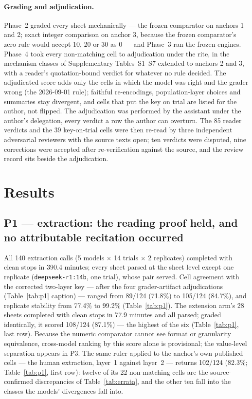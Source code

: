 \documentclass[11pt]{article}
\begin{document}
\paragraph{Grading and adjudication.} Phase~2 graded every sheet mechanically --- the frozen comparator on anchors 1 and 2; exact integer comparison on anchor 3, because the frozen comparator's zero rule would accept 10, 20 or 30 as 0 --- and Phase~3 ran the frozen engines. Phase~4 took every non-matching cell to adjudication under the rite, in the mechanism classes of Supplementary Tables~S1--S7 extended to anchors 2 and 3, with a reader's quotation-bound verdict for whatever no rule decided. The adjudicated score adds only the cells in which the model was right and the grader wrong (the 2026-09-01 rule); faithful re-encodings, population-layer choices and summaries stay divergent, and cells that put the key on trial are listed for the author, not flipped. The adjudication was performed by the assistant under the author's delegation, every verdict a row the author can overturn. The 85 reader verdicts and the 39 key-on-trial cells were then re-read by three independent adversarial reviewers with the source texts open; ten verdicts were disputed, nine corrections were accepted after re-verification against the source, and the review record sits beside the adjudication.

\section{Results}

\subsection{P1 --- extraction: the reading proof held, and no attributable recitation occurred}
All 140 extraction calls (5 models $\times$ 14 trials $\times$ 2 replicates) completed with clean stops in 390.4 minutes; every sheet parsed at the sheet level except one replicate (\texttt{deepseek-r1:14b}, one trial), whose pair served. Cell agreement with the corrected two-layer key --- after the four grader-artifact adjudications (Table~\ref{tab:p1} caption) --- ranged from 89/124 (71.8\%) to 105/124 (84.7\%), and replicate stability from 77.4\% to 99.2\% (Table~\ref{tab:p1}). The extension arm's 28 sheets completed with clean stops in 77.9 minutes and all parsed; graded identically, it scored 108/124 (87.1\%) --- the highest of the six (Table~\ref{tab:p1}, last row). Because the numeric comparator cannot see format or granularity equivalence, cross-model ranking by this score alone is provisional; the value-level separation appears in P3. The same ruler applied to the anchor's own published cells --- the human extraction, layer~1 against layer~2 --- returns 102/124 (82.3\%; Table~\ref{tab:p1}, first row): twelve of its 22 non-matching cells are the source-confirmed discrepancies of Table~\ref{tab:errata}, and the other ten fall into the classes the models' divergences fall into.
\end{document}
